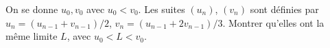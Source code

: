 On se donne $u_0, v_0$ avec $u_0 < v_0$. Les suites $(u_n)$, $(v_n)$ sont définies par $u_n = (u_{n-1} + v_{n-1})/2$, $v_n = (u_{n-1} + 2v_{n-1})/3$. Montrer qu'elles ont la même limite $L$, avec $u_0 < L < v_0$.
